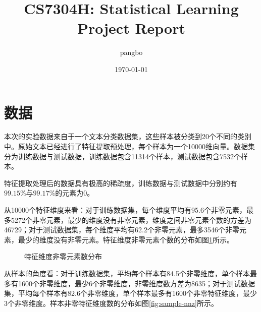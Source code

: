 \documentclass{article}
\title{CS7304H: Statistical Learning\\Project
 Report} %
\author{pangbo} %
\date{\today} %
\begin{document}
\maketitle %

\section{数据}

本次的实验数据来自于一个文本分类数据集，这些样本被分类到20个不同的类别中。原始文本已经进行了特征提取预处理，每个样本为一个10000维向量。数据集分为训练数据与测试数据，训练数据包含11314个样本，测试数据包含7532个样本。

特征提取处理后的数据具有极高的稀疏度，训练数据与测试数据中分别约有$99.15\%$与$99.17\%$的元素为0。

从10000个特征维度来看：对于训练数据集，每个维度平均有95.6个非零元素，最多5272个非零元素，最少的维度没有非零元素，维度之间非零元素个数的方差为46729；对于测试数据集，每个维度平均有62.2个非零元素，最多3546个非零元素，最少的维度没有非零元素。特征维度非零元素个数的分布如图\ref{fig:dim-nnz}所示。

\begin{figure}[htbp]
    \centering
    \hspace{0.5cm}
    \caption{特征维度非零元素数分布}
    \label{fig:dim-nnz}
\end{figure}


从样本的角度看：对于训练数据集，平均每个样本有84.5个非零维度，单个样本最多有1600个非零维度，最少6个非零维度，非零维度数方差为8635；对于测试数据集，平均每个样本有82.6个非零维度，单个样本最多有1600个非零特征维度，最少3个非零维度。样本非零特征维度数的分布如图\ref{fig:sample-nnz}所示。
\end{document}
